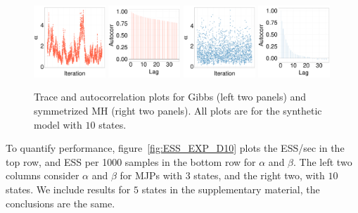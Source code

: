   \begin{figure}[H]
  \centering
  \begin{minipage}[!hp]{0.97\linewidth}
    \includegraphics [width=0.24\textwidth, angle=0]{figs/EXP_ks/exp_traceGBS_44_05_10_.pdf}
    \includegraphics [width=0.24\textwidth, angle=0]{figs/EXP_ks/exp_gbsacf_44_05_10_.pdf}
    \includegraphics [width=0.24\textwidth, angle=0]{figs/EXP_ks/exp_traceMH_44_05_10_.pdf}
    \includegraphics [width=0.24\textwidth, angle=0]{figs/EXP_ks/exp_mhacf_44_05_10_.pdf}
  \end{minipage}
  \caption{Trace and autocorrelation plots for Gibbs (left two panels) and symmetrized MH (right two panels). All plots are for the synthetic model with $10$ states.}
     \label{fig:TRACE_EXP}
  \end{figure}
  To quantify performance, figure~\ref{fig:ESS_EXP_D10} plots the ESS/sec in the top row, and ESS per 1000 samples in the bottom row for $\alpha$  and $\beta$. 
  The left two columns consider $\alpha$ and $\beta$ for MJPs with $3$ states, and the right two, with $10$ states. 
  We include results for $5$ states in the supplementary material, the conclusions are the same. 

